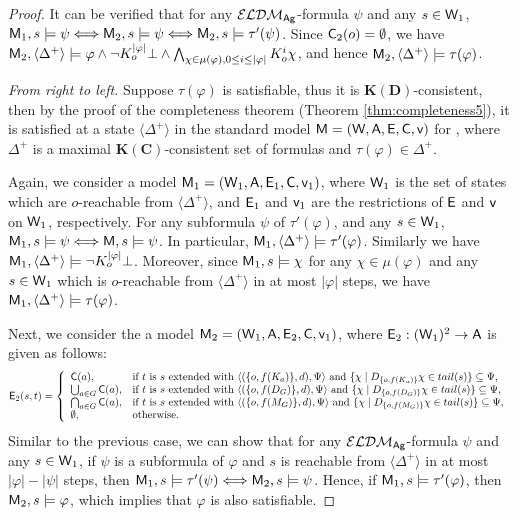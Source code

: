 \documentclass{article}
\newcommand{\ag}{\text{\normalfont\textsf{Ag}}\xspace}
\newcommand{\CA}{\textnormal{\sf A}\xspace}
\newcommand{\CC}{\textnormal{\sf C}\xspace}
\newcommand{\CE}{\textnormal{\sf E}\xspace}
\newcommand{\CM}{\textnormal{\sf M}\xspace}
\newcommand{\CV}{\textnormal{\sf v}\xspace}
\newcommand{\CW}{\textnormal{\sf W}\xspace}
\renewcommand{\phi}{\varphi}
\newcommand{\langdm}{\ensuremath{\mathcal{ELDM}}\xspace}
\newcommand{\ld}{\text{\normalfont ELD}\xspace}
\newcommand{\KC}{\ensuremath{\mathbf{K(C)}}\xspace}
\newcommand{\KD}{\ensuremath{\mathbf{K(D)}}\xspace}
\begin{document}
\begin{proof}
It can be verified that for any $\langdm_\ag$-formula $\psi$ and any $s\in\CW_1$, $\CM_1,s \models \psi \Longleftrightarrow \CM_2,s\models \psi \Longleftrightarrow \CM_2,s\models \tau'(\psi)$. Since $\CC_2(o)=\emptyset$, we have $\CM_2,\langle\Delta^+\rangle\models \phi \wedge \neg K_o^{|\phi|}\bot \wedge \bigwedge_{\chi \in \mu(\phi), 0\leq i\leq |\phi|} K_o^i \chi$, and hence $\CM_2,\langle\Delta^+\rangle\models\tau(\phi)$.

\emph{From right to left.} Suppose $\tau(\phi)$ is satisfiable, thus it is \KD-consistent, then by the proof of the completeness theorem (Theorem \ref{thm:completeness5}), it is satisfied at a state $\langle\Delta^+\rangle$ in the standard model $\CM=(\CW,\CA,\CE,\CC,\CV)$ for \ld, where $\Delta^+$ is a maximal $\KC$-consistent set of formulas and $\tau(\phi) \in \Delta^+$.

Again, we consider a model $\CM_1=(\CW_1,\CA,\CE_1,\CC,\CV_1)$, where $\CW_1$ is the set of states which are $o$-reachable from $\langle\Delta^+\rangle$, and $\CE_1$ and $\CV_1$ are the restrictions of $\CE$ and $\CV$ on $\CW_1$, respectively. For any subformula $\psi$ of $\tau'(\phi)$, and any $s\in\CW_1$, $\CM_1,s\models\psi \Longleftrightarrow \CM,s\models\psi$. In particular, $\CM_1,\langle\Delta^+\rangle\models\tau'(\phi)$. Similarly we have $\CM_1,\langle\Delta^+\rangle\models\neg K_o^{|\phi|}\bot$. Moreover, since $\CM_1,s\models\chi$ for any $\chi\in\mu(\phi)$ and any $s\in\CW_1$ which is $o$-reachable from $\langle\Delta^+\rangle$ in at most $|\phi|$ steps, we have $\CM_1,\langle\Delta^+\rangle\models\tau(\phi)$.

Next, we consider the a model $\CM_2=(\CW_1,\CA,\CE_2,\CC,\CV_1)$, where $\CE_2:(\CW_1)^2 \to \CA$ is given as follows:
		$$\CE_2(s,t)  = \left\{\begin{array}{ll}
			\CC(a), & \text{if $t$ is $s$ extended with $\langle (\{o,f(K_a)\},d), \Psi \rangle$ and $\{\chi\mid D_{\{o,f(K_a)\}}\chi \in tail(s)\}  \subseteq \Psi$},\\
			\bigcup_{a\in G} \CC(a), & \text{if $t$ is $s$ extended with $\langle (\{o,f(D_G)\},d), \Psi \rangle$ and $\{\chi\mid D_{\{o,f(D_G)\}}\chi \in tail(s)\}  \subseteq \Psi$},\\
			\bigcap_{a\in G} \CC(a), & \text{if $t$ is $s$ extended with $\langle (\{o,f(M_G)\},d), \Psi \rangle$ and $\{\chi\mid D_{\{o,f(M_G)\}}\chi \in tail(s)\}  \subseteq \Psi$},\\
			\emptyset, & \text{otherwise}.
		\end{array}\right.$$
Similar to the previous case, we can show that for any $\langdm_{\ag}$-formula $\psi$ and any $s\in\CW_1$, if $\psi$ is a subformula of $\phi$ and $s$ is reachable from $\langle \Delta^+ \rangle$ in at most $|\phi| - |\psi|$ steps, then $\CM_1,s\models \tau'(\psi) \Longleftrightarrow \CM_2,s\models \psi$. Hence, if $\CM_1,s\models \tau'(\phi)$, then $\CM_2,s\models \phi$, which implies that $\phi$ is also satisfiable.
\end{proof}
\end{document}
